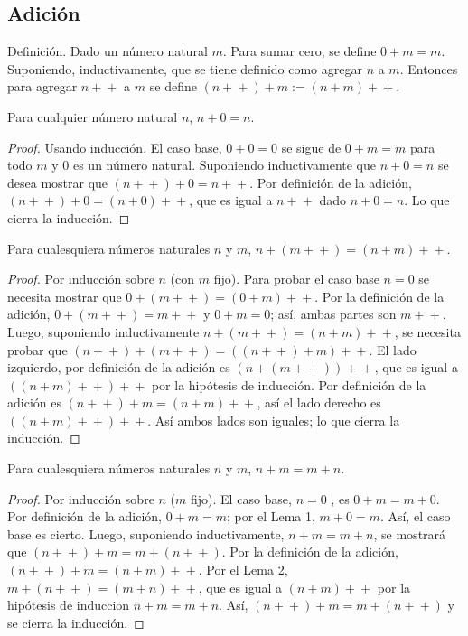 \subsection{Adición}

Definición. Dado un número natural $m$. Para sumar cero, se define $0 + m = m$. Suponiendo, inductivamente, que se tiene definido como agregar $n$ a $m$. Entonces para agregar $n\!+\!\!+$  a $m$ se define $(n\!+\!\!+) + m := (n+m)\!+\!\!+$.

\begin{lemma}
  Para cualquier número natural $n$, $n + 0 = n$.
\end{lemma}

\begin{proof}
  Usando inducción. El caso base, $0 + 0 = 0$ se sigue de $0 + m = m$ para todo $m$ y $0$ es un número natural. Suponiendo inductivamente que $n + 0 = n$ se desea mostrar que $(n\!+\!\!+) + 0 = n\!+\!\!+$. Por definición de la adición, $(n\!+\!\!+) + 0 = (n + 0)\!+\!\!+$, que es igual a $n\!+\!\!+$ dado $n + 0 = n$. Lo que cierra la inducción.
\end{proof}

\begin{lemma}
  Para cualesquiera números naturales $n$ y  $m$, $n + (m\!+\!\!+) = (n + m)\!+\!\!+$.
\end{lemma}

\begin{proof}
  Por inducción sobre $n$ (con $m$ fijo). Para probar el caso base $n = 0$ se necesita mostrar que $0 + (m\!+\!\!+) = (0 + m)\!+\!\!+$. Por la definición de la adición, $0 + (m\!+\!\!+) = m\!+\!\!+$ y $0 + m = 0$; así, ambas partes son $m\!+\!\!+$. Luego, suponiendo inductivamente $n + (m\!+\!\!+) = (n + m)\!+\!\!+$, se necesita probar que $(n\!+\!\!+) + (m\!+\!\!+) = ((n\!+\!\!+) +m)\!+\!\!+$. El lado izquierdo, por definición de la adición es $(n + (m\!+\!\!+))\!+\!\!+$, que es igual a $((n + m)\!+\!\!+)\!+\!\!+$ por la hipótesis de inducción. Por definición de la adición es $(n\!+\!\!+) + m = (n + m)\!+\!\!+$, así el lado derecho es $((n + m)\!+\!\!+)\!+\!\!+$. Así ambos lados son iguales; lo que cierra la inducción.
\end{proof}

\begin{proposition}[Conmutativa]\label{prop:ad.conmut}
  Para cualesquiera números naturales $n$ y $m$, $n + m = m + n$.
\end{proposition}

\begin{proof}
  Por inducción sobre $n$ ($m$ fijo). El caso base, $n = 0$ , es $0 + m = m + 0$. Por definición de la adición, $0 + m = m$; por el Lema 1, $m + 0 = m$. Así, el caso base es cierto. Luego, suponiendo inductivamente, $n + m = m + n$, se mostrará que $(n\!+\!\!+) + m = m + (n\!+\!\!+)$. Por la definición de la adición, $(n\!+\!\!+) + m = (n + m)\!+\!\!+$. Por el Lema 2, $m + (n\!+\!\!+) = (m + n)\!+\!\!+$, que es igual a $(n + m)\!+\!\!+$ por la hipótesis de induccion $n + m = m + n$. Así, $(n\!+\!\!+) + m = m + (n\!+\!\!+)$ y se cierra la inducción.
\end{proof}


